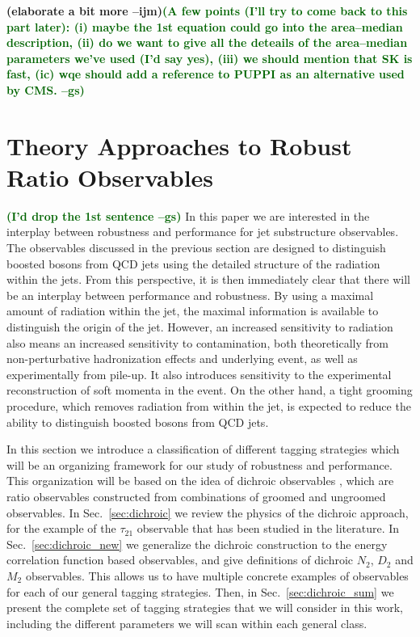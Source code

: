 \documentclass[11pt,letterpaper]{article}
\DeclareRobustCommand{\Sec}[1]{Sec.~\ref{#1}}
\newcommand{\ijm}[1]{\textbf{\textcolor{llblue}{(#1 --ijm)}}}
\newcommand{\gs}[1]{\textbf{\textcolor{darkgreen}{(#1 --gs)}}}
\begin{document}
\ijm{elaborate a bit more}\gs{A few points (I'll try to come back to
  this part later): (i) maybe the 1st equation could go into the
  area--median description, (ii) do we want to give all the deteails
  of the area--median parameters we've used (I'd say yes), (iii) we
  should mention that SK is fast, (ic) wqe should add a reference to
  PUPPI as an alternative used by CMS.}

\section{Theory Approaches to Robust Ratio Observables}\label{sec:hybrid_ratio}









\gs{I'd drop the 1st sentence}
In this paper we are interested in the interplay between robustness
and performance for jet substructure observables.
%
The observables discussed in the previous section are designed to
distinguish boosted bosons from QCD jets using the detailed structure
of the radiation within the jets. From this perspective, it is then
immediately clear that there will be an interplay between performance
and robustness. By using a maximal amount of radiation within the jet,
the maximal information is available to distinguish the origin of the
jet.  However, an increased sensitivity to radiation also means an
increased sensitivity to contamination, both theoretically from
non-perturbative hadronization effects and underlying event, as well
as experimentally from pile-up. It also introduces sensitivity to the
experimental reconstruction of soft momenta in the event. On the other
hand, a tight grooming procedure, which removes radiation from within
the jet, is expected to reduce the ability to distinguish boosted
bosons from QCD jets.

In this section we introduce a classification of different tagging strategies which will be an organizing framework for our study of robustness and performance. This organization will be based on the idea of dichroic observables \cite{Salam:2016yht}, which are ratio observables constructed from combinations of groomed and ungroomed observables. In \Sec{sec:dichroic} we review the physics of the dichroic approach, for the example of the $\tau_{21}$ observable that has been studied in the literature. In \Sec{sec:dichroic_new} we generalize the dichroic construction to the energy correlation function based observables, and give definitions of dichroic $N_2$, $D_2$ and $M_2$ observables. This allows us to have multiple concrete examples of observables for each of our general tagging strategies. Then, in \Sec{sec:dichroic_sum} we present the complete set of tagging strategies that we will consider in this work, including the different parameters we will scan within each general class.
\end{document}
